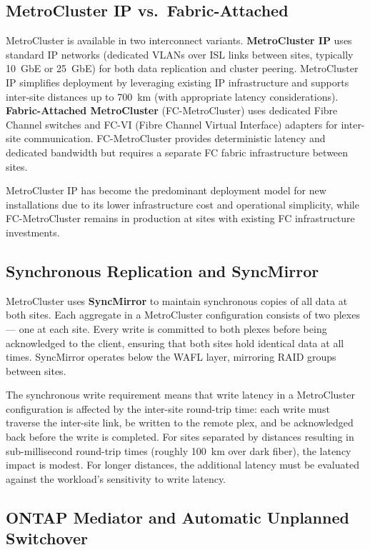 \subsection{MetroCluster IP vs.\ Fabric-Attached}

MetroCluster is available in two interconnect variants. \textbf{MetroCluster IP} uses standard IP networks (dedicated VLANs over ISL links between sites, typically 10~GbE or 25~GbE) for both data replication and cluster peering. MetroCluster IP simplifies deployment by leveraging existing IP infrastructure and supports inter-site distances up to 700~km (with appropriate latency considerations). \textbf{Fabric-Attached MetroCluster} (FC-MetroCluster) uses dedicated Fibre Channel switches and FC-VI (Fibre Channel Virtual Interface) adapters for inter-site communication. FC-MetroCluster provides deterministic latency and dedicated bandwidth but requires a separate FC fabric infrastructure between sites.

MetroCluster IP has become the predominant deployment model for new installations due to its lower infrastructure cost and operational simplicity, while FC-MetroCluster remains in production at sites with existing FC infrastructure investments.

\subsection{Synchronous Replication and SyncMirror}

MetroCluster uses \textbf{SyncMirror} to maintain synchronous copies of all data at both sites. Each aggregate in a MetroCluster configuration consists of two plexes --- one at each site. Every write is committed to both plexes before being acknowledged to the client, ensuring that both sites hold identical data at all times. SyncMirror operates below the WAFL layer, mirroring RAID groups between sites.

The synchronous write requirement means that write latency in a MetroCluster configuration is affected by the inter-site round-trip time: each write must traverse the inter-site link, be written to the remote plex, and be acknowledged back before the write is completed. For sites separated by distances resulting in sub-millisecond round-trip times (roughly 100~km over dark fiber), the latency impact is modest. For longer distances, the additional latency must be evaluated against the workload's sensitivity to write latency.

\subsection{ONTAP Mediator and Automatic Unplanned Switchover}

